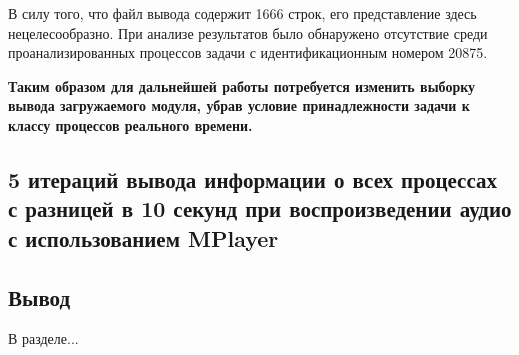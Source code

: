 В силу того, что файл вывода содержит 1666 строк, его представление здесь нецелесообразно. При анализе результатов было обнаружено отсутствие среди проанализированных процессов задачи с идентификационным номером 20875.

\textbf{Таким образом для дальнейшей работы потребуется изменить выборку вывода загружаемого модуля, убрав условие принадлежности задачи к классу процессов реального времени.}

\subsection{5 итераций вывода информации о всех процессах с разницей в 10 секунд при воспроизведении аудио с использованием MPlayer}

\subsection*{Вывод}
В разделе...
